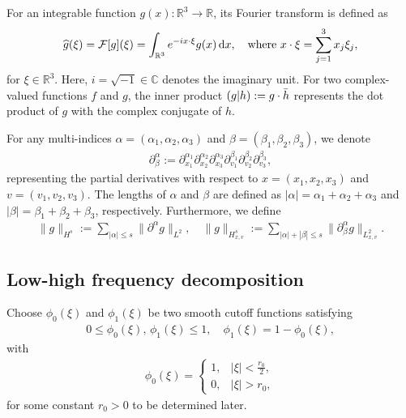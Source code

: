 \documentclass[reqno,11pt]{amsart}
\theoremstyle{plain}
\numberwithin{equation}{section}
\begin{document}
For an integrable function $g(x): \mathbb{R}^3 \to \mathbb{R}$, its Fourier transform is defined as  
\begin{equation*}  
\widehat{g}(\xi) = \mathcal{F}[g](\xi) = \int_{\mathbb{R}^3} e^{-i x \cdot \xi} g(x) \, {\rm d}x, \quad \text{where } x \cdot \xi = \sum_{j=1}^3 x_j \xi_j,  
\end{equation*}  
for $\xi \in \mathbb{R}^3$. 
Here, $i = \sqrt{-1} \in \mathbb{C}$ denotes the imaginary unit. For two complex-valued functions $f$ and $g$, the inner product $(g|h) := g \cdot \Bar{h}$ represents the dot product of $g$ with the complex conjugate of $h$.  

For any multi-indices $\alpha = (\alpha_1, \alpha_2, \alpha_3)$ and $\beta = (\beta_1, \beta_2, \beta_3)$, we denote    
\begin{align*}  
\partial_\beta^\alpha :=  \partial_{x_1}^{\alpha_1}\partial_{x_2}^{\alpha_2}\partial_{x_3}^{\alpha_3}   \partial_{v_1}^{\beta_1}\partial_{v_2}^{\beta_2}\partial_{v_3}^{\beta_3},  
\end{align*}  
representing the partial derivatives with respect to $x = (x_1, x_2, x_3)$ and $v = (v_1, v_2, v_3)$. The lengths of $\alpha$ and $\beta$ are defined as $|\alpha| = \alpha_1 + \alpha_2 + \alpha_3$ and $|\beta| = \beta_1 + \beta_2 + \beta_3$, respectively. Furthermore, we define  
\begin{align*}  
\|g\|_{H^s} := \sum_{|\alpha| \leq s} \|\partial^\alpha g\|_{L^2}, \quad \|g\|_{H_{x, v}^s} := \sum_{|\alpha| + |\beta| \leq s} \|\partial_\beta^\alpha g\|_{L^2_{x,v}}.  
\end{align*} 

\subsection{Low-high frequency   decomposition}

Choose $\phi_0(\xi)$ and $\phi_1(\xi)$ be two smooth cutoff functions satisfying  
\begin{align*}  
0 \leq \phi_0(\xi),\, \phi_1(\xi) \leq 1, \quad \phi_1(\xi) = 1 - \phi_0(\xi),  
\end{align*}  
with  
\begin{align}\label{G2.2}  
\phi_0(\xi) = \begin{cases}  
1, & |\xi| < \frac{r_0}{2}, \\  
0, & |\xi| > r_0,  
\end{cases}  
\end{align}  
for some constant $r_0 > 0$ to be determined later.  
\end{document}

